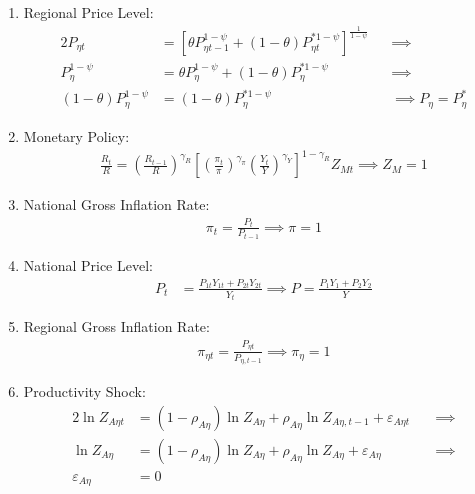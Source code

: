 \documentclass[
thesis.tex
]{subfiles}
\begin{document}
\begin{enumerate}
	\item Regional Price Level:
	\begin{alignat}{2}
		P_{\eta t} &= \left[ \theta P_{\eta t-1}^{1-\psi} + (1-\theta) P_{\eta t}^{\ast 1-\psi} \right]^\frac{1}{1-\psi} &&\implies \nonumber \\
		P_{\eta}^{1-\psi} &= \theta P_{\eta}^{1-\psi} + (1-\theta) P_{\eta}^{\ast 1-\psi} &&\implies \nonumber \\ 
		(1-\theta) P_{\eta}^{1-\psi} &= (1-\theta) P_{\eta}^{\ast 1-\psi} &&\implies P_{\eta} = P_{\eta}^{\ast} \label{eq:reg-ss-general-price-level}
	\end{alignat}
	
	\item Monetary Policy:
	\begin{align}
		\label{eq:reg-ss-monetary-policy}
		\frac{R_{t}}{R} =
		\left( \frac{R_{t-1}}{R} \right)^{\gamma_R}  \left[
		\left( \frac{\pi_t}{\pi} \right)^{\gamma_\pi}
		\left( \frac{Y_{t}}{Y} \right)^{\gamma_Y} \right]^{1-\gamma_R} Z_{Mt}
		\implies Z_{M} = 1
	\end{align}
	
	\item National Gross Inflation Rate:
	\begin{align}
		\pi_t = \frac{P_t}{P_{t-1}} \implies \pi = 1 \label{eq:reg-ss-gross-inflation-rate}
	\end{align}
	
	\item National Price Level:
	\begin{align}
		P_t &= \frac{P_{1t} Y_{1t} + P_{2t} Y_{2t}}{Y_{t}} \implies P = \frac{P_{1} Y_{1} + P_{2} Y_{2}}{Y_{}} \label{eq:ss-national-price-level} %
	\end{align}
	
	\item Regional Gross Inflation Rate:
	\begin{align}
		\pi_{\eta t} = \frac{P_{\eta t}}{P_{\eta, t-1}} \implies \pi_{\eta} = 1 \label{eq:ss-regional-inflation}
	\end{align}
	
	\item Productivity Shock:
	\begin{alignat}{2}
		\ln{Z_{A\eta t}} &= (1 -\rho_{A\eta}) \ln{Z_{A\eta}} + \rho_{A\eta} \ln{Z_{A\eta,t-1}} + \varepsilon_{A\eta t} \quad &\implies \nonumber \\
		\ln{Z_{A\eta}} &= (1 -\rho_{A\eta}) \ln{Z_{A\eta}} + \rho_{A\eta} \ln{Z_{A\eta}} + \varepsilon_{A\eta} &\implies \nonumber \\
		\varepsilon_{A\eta} &= 0 \label{eq:reg-ss-productivity-shock}
	\end{alignat}
	

\end{enumerate}
\end{document}
